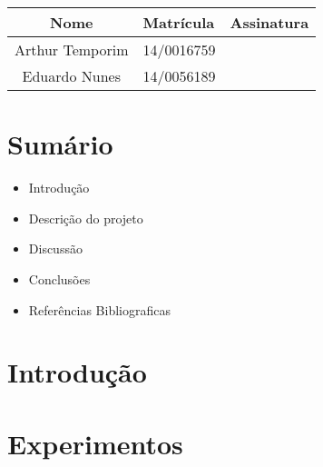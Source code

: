 \documentclass[12pts]{article}
\date{Novembro 16, 2016}
\begin{document}
\maketitle	
\begin{center}

\begin{tabular}{|c|l|r|}
\hline
Nome & Matrícula & Assinatura\\
\hline

Arthur Temporim & 14/0016759 & \\
\hline	
Eduardo Nunes & 14/0056189 & \\

\hline	
\end{tabular}

\end{center}


\newpage

\section{Sumário}

\begin{itemize}
	\item Introdução
	\singlespacing
	\item Descrição do projeto
	\singlespacing
	\item Discussão
	\singlespacing
	\item Conclusões 
	\singlespacing
	\item Referências Bibliograficas
	\singlespacing
\end{itemize}

\newpage


\section{Introdução}
\iffalse
Introdução, indicando a delimitação do tema, apresentando a justificativa descrevendo o propósito do relatório.
\fi

\section{Experimentos}
\iffalse
Parte Experimental, descrevendo os passos realizados, dificuldades e soluções para os problemas encontrados. Aqui, deve-se apresentar uma descrição dos resultados encontrados em forma de figuras, gráficos e tabelas.
\fi
\end{document}
